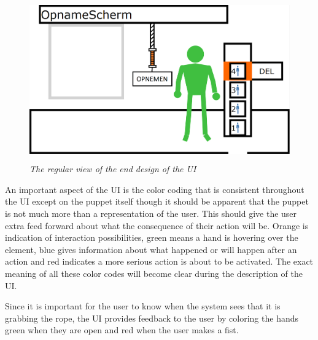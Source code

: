 \begin{figure}[H]
	\begin{center}
		\includegraphics[width=12.5cm, height=7cm]{figures/1_screen_with_user.png}
		\caption{\emph{The regular view of the end design of the UI}}
		\label{regular view end design}
	\end{center}
\end{figure}

An important aspect of the UI is the color coding that is consistent throughout the UI except on the puppet itself though it should be apparent that the puppet is not much more than a representation of the user. This should give the user extra feed forward about what the consequence of their action will be. Orange is indication of interaction possibilities, green means a hand is hovering over the element, blue gives information about what happened or will happen after an action and red indicates a more serious action is about to be activated. The exact meaning of all these color codes will become clear during the description of the UI.

Since it is important for the user to know when the system sees that it is grabbing the rope, the UI provides feedback to the user by coloring the hands green when they are open and red when the user makes a fist.

